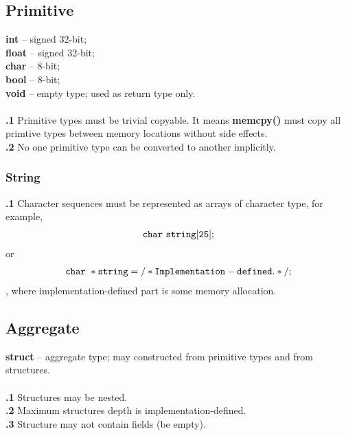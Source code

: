 \documentclass[leqno]{article}
\begin{document}
            \subsection{Primitive}
                \textbf{int} -- signed 32-bit; \\
                \textbf{float} -- signed 32-bit; \\
                \textbf{char} -- 8-bit; \\
                \textbf{bool} -- 8-bit; \\
                \textbf{void} -- empty type; used as return type only. \\
                \\
                \textbf{\thesubsection.1} Primitive types must be trivial copyable. It means
                \textbf{memcpy()} must copy all primtive types between memory locations
                without side effects. \\
                \textbf{\thesubsection.2} No one primitive type can be converted to another implicitly.
                \subsubsection{String}
                
                \textbf{\thesubsubsection.1} Character sequences must be represented
                as arrays of character type, for example,
                \begin{align*}
                    \tt{char\ string[25];}
                \end{align*}
                or
                \begin{align*}
                    \tt{char\ *string = /* Implementation-defined. */;}
                \end{align*}
                , where implementation-defined part is some memory allocation.

            \subsection{Aggregate}
                \textbf{struct} -- aggregate type; may constructed from primitive
                types and from structures. \\
                \\
                \textbf{\thesubsection.1} Structures may be nested. \\
                \textbf{\thesubsection.2} Maximum structures depth is implementation-defined. \\
                \textbf{\thesubsection.3} Structure may not contain fields (be empty).
\end{document}
